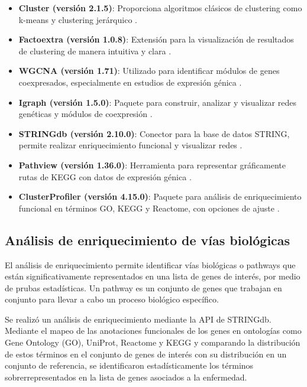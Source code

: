 \begin{itemize}
	\item \textbf{Cluster (versión 2.1.5)}: Proporciona algoritmos clásicos de clustering como k-means y clustering jerárquico \cite{cluster}.
	\item \textbf{Factoextra (versión 1.0.8)}: Extensión para la visualización de resultados de clustering de manera intuitiva y clara \cite{factoextra}.
	\item \textbf{WGCNA (versión 1.71)}: Utilizado para identificar módulos de genes coexpresados, especialmente en estudios de expresión génica \cite{wgcna}.
	\item \textbf{Igraph (versión 1.5.0)}: Paquete para construir, analizar y visualizar redes genéticas y módulos de coexpresión \cite{igraph}.
	\item \textbf{STRINGdb (versión 2.10.0)}: Conector para la base de datos STRING, permite realizar enriquecimiento funcional y visualizar redes \cite{stringdb}.
	\item \textbf{Pathview (versión 1.36.0)}: Herramienta para representar gráficamente rutas de KEGG con datos de expresión génica \cite{pathview}.
	\item \textbf{ClusterProfiler (versión 4.15.0)}: Paquete para análisis de enriquecimiento funcional en términos GO, KEGG y Reactome, con opciones de ajuste \cite{clusterprofiler}.
\end{itemize}

\subsection{Análisis de enriquecimiento de vías biológicas}

El análisis de enriquecimiento permite identificar vías biológicas o pathways que están significativamente representados en una lista de genes de interés, por medio de prubas estadísticas. Un pathway es un conjunto de genes que trabajan en conjunto para llevar a cabo un proceso biológico específico.\cite{Reimand2019}

Se realizó un análisis de enriquecimiento mediante la API de STRINGdb. Mediante el mapeo de las anotaciones funcionales de los genes en ontologías como Gene Ontology (GO), UniProt, Reactome y KEGG y comparando la distribución de estos términos en el conjunto de genes de interés con su distribución en un conjunto de referencia, se identificaron estadísticamente los términos sobrerrepresentados en la lista de genes asociados a la enfermedad. \cite{Tipney2010}

